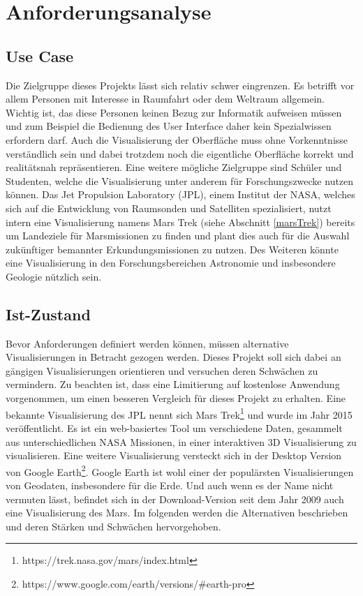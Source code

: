 \chapter{Anforderungsanalyse}\label{chapter3}

\section{Use Case}
Die Zielgruppe dieses Projekts lässt sich relativ schwer eingrenzen. Es betrifft vor allem Personen mit Interesse in Raumfahrt oder dem Weltraum allgemein. Wichtig ist, das diese Personen keinen Bezug zur Informatik aufweisen müssen und zum Beispiel die Bedienung des User Interface daher kein Spezialwissen erfordern darf. Auch die Visualisierung der Oberfläche muss ohne Vorkenntnisse verständlich sein und dabei trotzdem noch die eigentliche Oberfläche korrekt und realitätsnah repräsentieren. Eine weitere mögliche Zielgruppe sind Schüler und Studenten, welche die Visualisierung unter anderem für Forschungszwecke nutzen können. Das Jet Propulsion Laboratory (JPL), einem Institut der NASA, welches sich auf die Entwicklung von Raumsonden und Satelliten spezialisiert, nutzt intern eine Visualisierung namens Mars Trek (siehe Abschnitt \ref{marsTrek}) bereits um Landeziele für Marsmissionen zu finden und plant dies auch für die Auswahl zukünftiger bemannter Erkundungsmissionen zu nutzen\cite{marsTrek}. Des Weiteren könnte eine Visualisierung in den Forschungsbereichen Astronomie und insbesondere Geologie nützlich sein.

\section{Ist-Zustand}\label{istZustand}
Bevor Anforderungen definiert werden können, müssen alternative Visualisierungen in Betracht gezogen werden. Dieses Projekt soll sich dabei an gängigen Visualisierungen orientieren und versuchen deren Schwächen zu vermindern. Zu beachten ist, dass eine Limitierung auf kostenlose Anwendung vorgenommen, um einen besseren Vergleich für dieses Projekt zu erhalten. Eine bekannte Visualisierung des JPL nennt sich Mars Trek\footnote{https://trek.nasa.gov/mars/index.html} und wurde im Jahr 2015 veröffentlicht. Es ist ein web-basiertes Tool um verschiedene Daten, gesammelt aus unterschiedlichen NASA Missionen, in einer interaktiven 3D Visualisierung zu visualisieren. Eine weitere Visualisierung versteckt sich in der Desktop Version von Google Earth\footnote{https://www.google.com/earth/versions/\#earth-pro}. Google Earth ist wohl einer der populärsten Visualisierungen von Geodaten, insbesondere für die Erde. Und auch wenn es der Name nicht vermuten lässt, befindet sich in der Download-Version seit dem Jahr 2009 auch eine Visualisierung des Mars. Im folgenden werden die Alternativen beschrieben und deren Stärken und Schwächen hervorgehoben.

